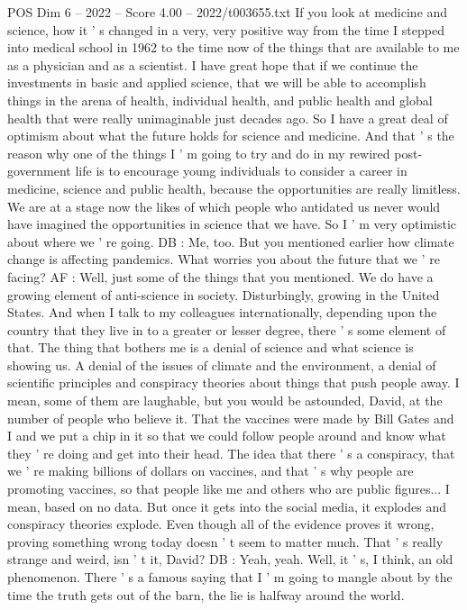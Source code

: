 \begin{textsample}{POS Dim 6 – 2022 – Score 4.00 – 2022/t003655.txt}
If you look at medicine and science, how it ' s changed in a very, very positive way from the time I stepped into medical school in 1962 to the time now of the things that are available to me as a physician and as a scientist.
I have great hope that if we continue the investments in basic and applied science, that we will be able to accomplish things in the arena of health, individual health, and public health and global health that were really unimaginable just decades ago.
So I have a great deal of optimism about what the future holds for science and medicine.
And that ' s the reason why one of the things I ' m going to try and do in my rewired post-government life is to encourage young individuals to consider a career in medicine, science and public health, because the opportunities are really limitless.
We are at a stage now the likes of which people who antidated us never would have imagined the opportunities in science that we have.
So I ' m very optimistic about where we ' re going.
DB : Me, too.
But you mentioned earlier how climate change is affecting pandemics.
What worries you about the future that we ' re facing?
AF : Well, just some of the things that you mentioned.
We do have a growing element of anti-science in society.
Disturbingly, growing in the United States.
And when I talk to my colleagues internationally, depending upon the country that they live in to a greater or lesser degree, there ' s some element of that.
The thing that bothers me is a denial of science and what science is showing us.
A denial of the issues of climate and the environment, a denial of scientific principles and conspiracy theories about things that push people away.
I mean, some of them are laughable, but you would be astounded, David, at the number of people who believe it.
That the vaccines were made by Bill Gates and I and we put a chip in it so that we could follow people around and know what they ' re doing and get into their head.
The idea that there ' s a conspiracy, that we ' re making billions of dollars on vaccines, and that ' s why people are promoting vaccines, so that people like me and others who are public figures...
I mean, based on no data.
But once it gets into the social media, it explodes and conspiracy theories explode.
Even though all of the evidence proves it wrong, proving something wrong today doesn ' t seem to matter much.
That ' s really strange and weird, isn ' t it, David?
DB : Yeah, yeah.
Well, it ' s, I think, an old phenomenon.
There ' s a famous saying that I ' m going to mangle about by the time the truth gets out of the barn, the lie is halfway around the world.

\end{textsample}
